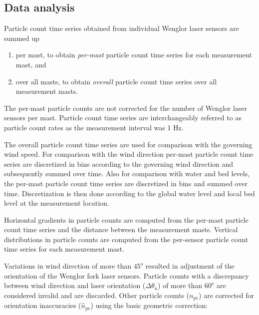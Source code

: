 \subsection{Data analysis}

Particle count time series obtained from individual Wenglor laser
sensors are summed up
\begin{enumerate}
\item per mast, to obtain \emph{per-mast} particle count time series
  for each measurement mast, and
\item over all masts, to obtain \emph{overall} particle count time
  series over all measurement masts.
\end{enumerate}
The per-mast particle counts are not corrected for the number of
Wenglor laser sensors per
mast. %
Particle count time series are interchangeably referred to as
particle count rates as the measurement interval was 1 Hz.

The overall particle count time series are used for comparison with
the governing wind speed. For comparison with the wind direction
per-mast particle count time series are discretized in bins according
to the governing wind direction and subsequently summed over
time. Also for comparison with water and bed levels, the per-mast
particle count time series are discretized in bins and summed over
time. Discretization is then done according to the global water level
and local bed level at the measurement location.

Horizontal gradients in particle counts are computed from the per-mast
particle count time series and the distance between the measurement
masts. Vertical distributions in particle counts are computed from the
per-sensor particle count time series for each measurement mast.

Variations in wind direction of more than $45^o$ resulted in
adjustment of the orientation of the Wenglor fork laser
sensors. Particle counts with a discrepancy between wind direction and
laser orientation ($\Delta \theta_u$) of more than $60^o$ are
considered invalid and are discarded. Other particle counts
($n_{\mathrm{pc}}$) are corrected for orientation inaccuracies
($\hat{n}_{\mathrm{pc}}$) using the basic geometric correction:

